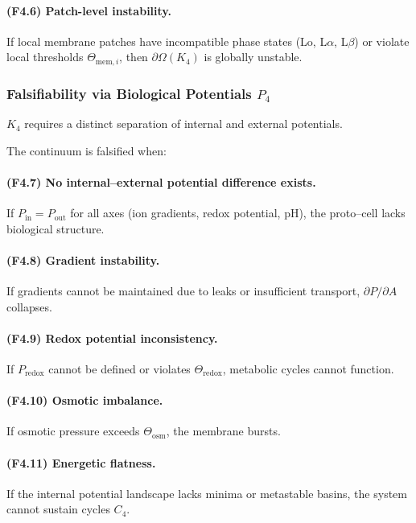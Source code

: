 \paragraph{(F4.6) Patch-level instability.}
If local membrane patches have incompatible phase states (Lo, L$\alpha$,
L$\beta$) or violate local thresholds
$\Theta_{\mathrm{mem},i}$, then $\partial\Omega(K_4)$ is globally unstable.



\subsubsection{Falsifiability via Biological Potentials \texorpdfstring{$P_4$}{P_4}}

$K_4$ requires a distinct separation of internal and external potentials.

The continuum is falsified when:

\paragraph{(F4.7) No internal–external potential difference exists.}
If $P_{\mathrm{in}} = P_{\mathrm{out}}$ for all axes
(ion gradients, redox potential, pH), the proto–cell lacks biological
structure.

\paragraph{(F4.8) Gradient instability.}
If gradients cannot be maintained due to leaks or insufficient transport,
$\partial P/\partial A$ collapses.

\paragraph{(F4.9) Redox potential inconsistency.}
If $P_{\mathrm{redox}}$ cannot be defined or violates
$\Theta_{\mathrm{redox}}$, metabolic cycles cannot function.

\paragraph{(F4.10) Osmotic imbalance.}
If osmotic pressure exceeds $\Theta_{\mathrm{osm}}$, the membrane bursts.

\paragraph{(F4.11) Energetic flatness.}
If the internal potential landscape lacks minima or metastable basins,
the system cannot sustain cycles $C_4$.



